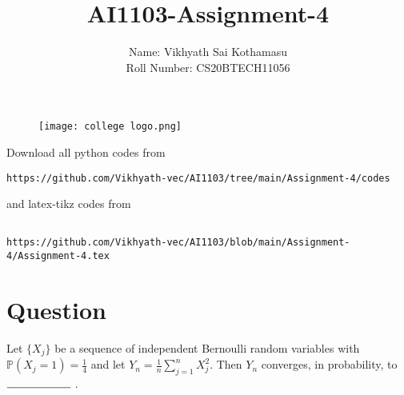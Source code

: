 \documentclass[journal,12pt,twocolumn]{IEEEtran}
\begin{document}
\title{AI1103-Assignment-4}
\author{Name: Vikhyath Sai Kothamasu\\Roll Number: CS20BTECH11056}
\maketitle
\newpage
\bigskip
\renewcommand{\thefigure}{\theenumi}
\renewcommand{\thetable}{\theenumi}

\begin{figure} [h]
    \texttt{[image: college logo.png]}
\end{figure}

Download all python codes from 
\begin{lstlisting}
https://github.com/Vikhyath-vec/AI1103/tree/main/Assignment-4/codes
\end{lstlisting}
%
and latex-tikz codes from 
%
\begin{lstlisting}

https://github.com/Vikhyath-vec/AI1103/blob/main/Assignment-4/Assignment-4.tex
\end{lstlisting}
\section*{Question}
Let $\{X_j\}$ be a sequence of independent Bernoulli random variables with $\mathbb{P}(X_j=1) = \frac{1}{4}$ and let $Y_n = \frac{1}{n} \sum_{j=1}^{n}X_j^2$. Then $Y_n$ converges, in probability, to $\rule{2cm}{0.15mm}$ .
\end{document}
